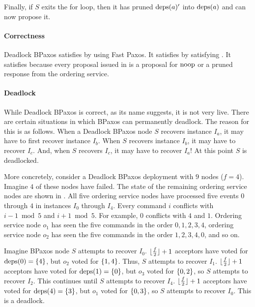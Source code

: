 Finally, if $S$ exits the for loop, then it has pruned $\text{deps}(a)'$ into
$\text{deps}(a)$ and can now propose it.

\paragraph{Correctness}
Deadlock BPaxos satisfies  by using Fast Paxos. It
satisfies  by satisfying
. It satisfies  because
every proposal issued in  is a proposal for $\text{noop}$ or
a pruned response from the ordering service.

\paragraph{Deadlock}
While Deadlock BPaxos is correct, as its name suggests, it is not very live.
There are certain situations in which BPaxos can permanently deadlock. The
reason for this is as follows. When a Deadlock BPaxos node $S$ recovers
instance $I_a$, it may have to first recover instance $I_b$. When $S$ recovers
instance $I_b$, it may have to recover $I_c$. And, when $S$ recovers $I_c$, it
may have to recover $I_a$! At this point $S$ is deadlocked.

More concretely, consider a Deadlock BPaxos deployment with $9$ nodes ($f =
4$). Imagine $4$ of these nodes have failed. The state of the remaining
ordering service nodes are shown in . All five
ordering service nodes have processed five events $0$ through $4$ in instances
$I_0$ through $I_4$. Every command $i$ conflicts with $i - 1 \bmod 5$ and $i +
1 \bmod 5$. For example, $0$ conflicts with $4$ and $1$. Ordering service node
$o_1$ has seen the five commands in the order $0, 1, 2, 3, 4$, ordering service
node $o_2$ has seen the five commands in the order $1, 2, 3, 4, 0$, and so on.

{}

Imagine BPaxos node $S$ attempts to recover $I_0$. $\lfloor\frac{f}{2}\rfloor + 1$
acceptors have voted for $\text{deps}(0) = \{4\}$, but $o_2$ voted for $\{1,
4\}$. Thus, $S$ attempts to recover $I_1$. $\lfloor\frac{f}{2}\rfloor + 1$ acceptors have
voted for $\text{deps}(1) = \{0\}$, but $o_3$ voted for $\{0, 2\}$, so $S$
attempts to recover $I_2$. This continues until $S$ attempts to recover $I_4$.
$\lfloor\frac{f}{2}\rfloor + 1$ acceptors have voted for $\text{deps}(4) = \{3\}$, but $o_1$
voted for $\{0, 3\}$, so $S$ attempts to recover $I_0$. This is a deadlock.

